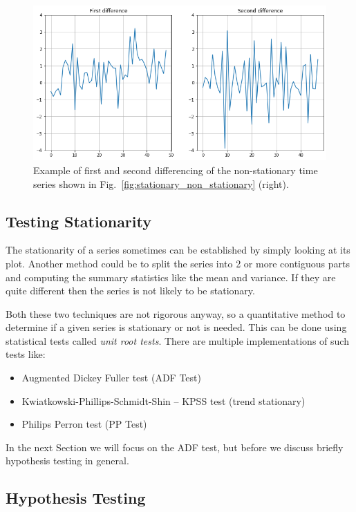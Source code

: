 \begin{figure}[htb]
	\centering
	\includegraphics[width=0.7\linewidth]{figures/first_second_differencing.png}
	\caption{Example of first and second differencing of the non-stationary time series shown in Fig.~\ref{fig:stationary_non_stationary} (right).}
	\label{fig:1st_2nd_differencing}
\end{figure}
    
\subsection{Testing Stationarity}\label{testing-stationarity}

The stationarity of a series sometimes can be established by simply
looking at its plot. Another method could be to split the series into 2
or more contiguous parts and computing the summary statistics like the
mean and variance. If they are quite different then the series is not
likely to be stationary.

Both these two techniques are not rigorous anyway, so a quantitative
method to determine if a given series is stationary or not is needed.
This can be done using statistical tests called \emph{unit root tests}.
There are multiple implementations of such tests like:

\begin{itemize}
\tightlist
\item
  Augmented Dickey Fuller test (ADF Test)
\item
  Kwiatkowski-Phillips-Schmidt-Shin -- KPSS test (trend stationary)
\item
  Philips Perron test (PP Test)
\end{itemize}

In the next Section we will focus on the ADF test, but before we discuss
briefly hypothesis testing in general.

\subsection{Hypothesis Testing}\label{hypothesis-testing}

